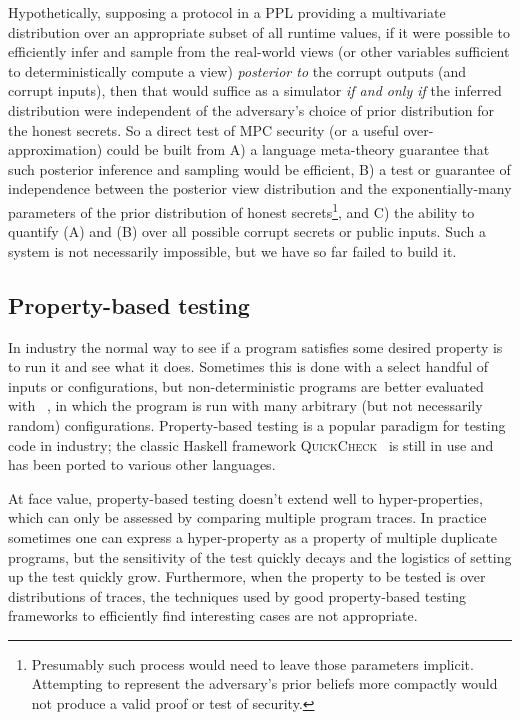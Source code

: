 \documentclass[compsoc, conference, a4paper, 10pt, times]{IEEEtran}
\begin{document}
Hypothetically, supposing a protocol in a PPL providing a multivariate distribution over an appropriate subset of all runtime values,
if it were possible to efficiently infer and sample from the real-world views
(or other variables sufficient to deterministically compute a view)
\textit{posterior to} the corrupt outputs (and corrupt inputs),
then that would suffice as a simulator
\textit{if and only if} the inferred distribution were independent of the adversary's choice of prior distribution for the honest secrets.
So a direct test of MPC security (or a useful over-approximation) could be built from
A) a language meta-theory guarantee that such posterior inference and sampling would be efficient,
B) a test or guarantee of independence between the posterior view distribution and the exponentially-many parameters
of the prior distribution of honest secrets\footnote{
    Presumably such process would need to leave those parameters implicit.
    Attempting to represent the adversary's prior beliefs more compactly would not produce a valid proof or test of security.
}, and
C) the ability to quantify (A) and (B) over all possible corrupt secrets or public inputs.
Such a system is not necessarily impossible, but we have so far failed to build it.

\subsection{Property-based testing}

In industry the normal way to see if a program satisfies some desired property is to run it and see what it does.
Sometimes this is done with a select handful of inputs or configurations,
but non-deterministic programs are better evaluated with ~\cite{fink1997property, claessen2000quickcheck, paraskevopoulou2015foundational},
in which the program is run with many arbitrary (but not necessarily random) configurations.
Property-based testing is a popular paradigm for testing code in industry;
the classic Haskell framework \textsc{QuickCheck}~\cite{claessen2000quickcheck}
is still in use and has been ported to various other languages.

At face value, property-based testing doesn't extend well to hyper-properties,
which can only be assessed by comparing multiple program traces.
In practice sometimes one can express a hyper-property as a property of multiple duplicate programs,
but the sensitivity of the test quickly decays and the logistics of setting up the test quickly grow.
Furthermore, when the property to be tested is over distributions of traces,
the techniques used by good property-based testing frameworks to efficiently find interesting cases are not appropriate.
\end{document}
